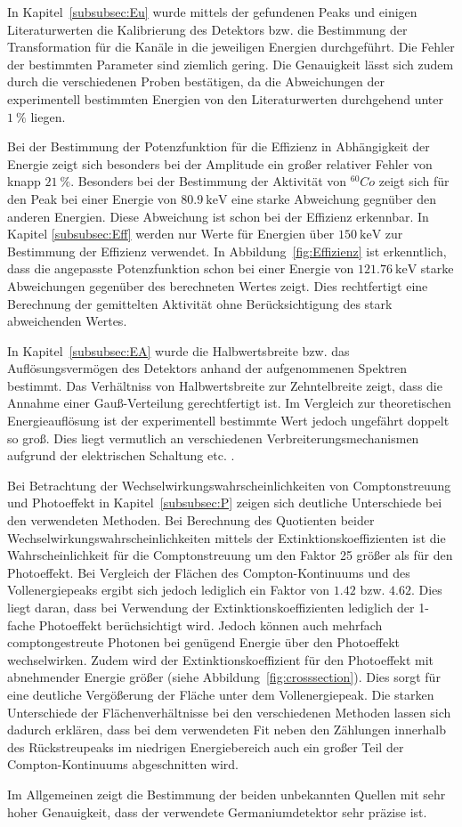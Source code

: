 In Kapitel~\ref{subsubsec:Eu} wurde mittels der gefundenen Peaks und einigen Literaturwerten
die Kalibrierung des Detektors bzw. die Bestimmung der Transformation für die Kanäle
in die jeweiligen Energien durchgeführt. Die Fehler der bestimmten Parameter
sind ziemlich gering. Die Genauigkeit lässt sich zudem durch die
verschiedenen Proben bestätigen, da die Abweichungen der experimentell bestimmten
Energien von den Literaturwerten durchgehend unter $\SI{1}{\percent}$ liegen.

Bei der Bestimmung der Potenzfunktion für die Effizienz in Abhängigkeit der Energie
zeigt sich besonders bei der Amplitude ein großer relativer Fehler von knapp
$\SI{21}{\percent}$. Besonders bei der Bestimmung der Aktivität von $^{60}{Co}$
zeigt sich für den Peak bei
einer Energie von $\SI{80.9}{\kilo\eV}$ eine starke Abweichung gegnüber den anderen
Energien. Diese Abweichung ist schon bei der Effizienz erkennbar. In Kapitel
\ref{subsubsec:Eff} werden nur Werte für Energien über $\SI{150}{\kilo\eV}$ zur
Bestimmung der Effizienz verwendet. In Abbildung~\ref{fig:Effizienz} ist erkenntlich,
dass die angepasste Potenzfunktion schon bei einer Energie von $\SI{121.76}{\kilo\eV}$
starke Abweichungen gegenüber des berechneten Wertes zeigt. Dies rechtfertigt eine
Berechnung der gemittelten Aktivität ohne Berücksichtigung des stark abweichenden
Wertes.

In Kapitel~\ref{subsubsec:EA} wurde die Halbwertsbreite bzw. das Auflösungsvermögen
des Detektors anhand der aufgenommenen Spektren bestimmt. Das Verhältniss von
Halbwertsbreite zur Zehntelbreite zeigt, dass die Annahme einer Gauß-Verteilung
gerechtfertigt ist. Im Vergleich zur theoretischen Energieauflösung ist der
experimentell bestimmte Wert jedoch ungefährt doppelt so groß. Dies liegt vermutlich
an verschiedenen Verbreiterungsmechanismen aufgrund der elektrischen Schaltung etc. .

Bei Betrachtung der Wechselwirkungswahrscheinlichkeiten von Comptonstreuung und
Photoeffekt in Kapitel~\ref{subsubsec:P} zeigen sich deutliche Unterschiede
bei den verwendeten Methoden. Bei Berechnung des Quotienten beider
Wechselwirkungswahrscheinlichkeiten mittels der Extinktionskoeffizienten
ist die Wahrscheinlichkeit für die Comptonstreuung um den Faktor 25 größer als
für den Photoeffekt. Bei Vergleich der Flächen des Compton-Kontinuums und des
Vollenergiepeaks ergibt sich jedoch lediglich ein Faktor von $\num{1.42}$
bzw. $\num{4.62}$. Dies liegt daran, dass bei Verwendung der Extinktionskoeffizienten
lediglich der 1-fache Photoeffekt berüchsichtigt wird. Jedoch können auch mehrfach
comptongestreute Photonen bei genügend Energie über den Photoeffekt wechselwirken.
Zudem wird der Extinktionskoeffizient für den Photoeffekt mit abnehmender Energie
größer (siehe Abbildung~\ref{fig:crosssection}). Dies sorgt für eine deutliche
Vergößerung der Fläche unter dem Vollenergiepeak. Die starken Unterschiede der
Flächenverhältnisse bei den verschiedenen Methoden lassen sich dadurch erklären,
dass bei dem verwendeten Fit neben den Zählungen innerhalb des Rückstreupeaks
im niedrigen Energiebereich auch ein großer Teil der Compton-Kontinuums
abgeschnitten wird.

Im Allgemeinen zeigt die Bestimmung der beiden unbekannten Quellen mit sehr hoher
Genauigkeit, dass der verwendete Germaniumdetektor sehr präzise ist.
